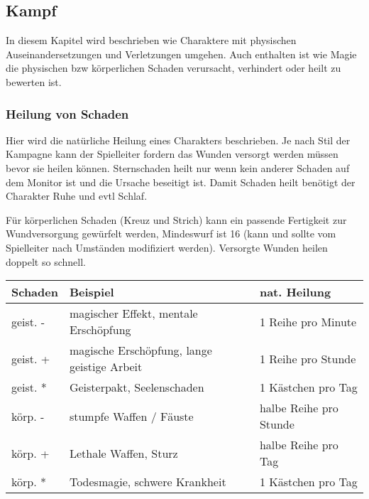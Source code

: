 \documentclass{article}
\begin{document}
\begin{center}
\section{Kampf}
\end{center}

In diesem Kapitel wird beschrieben wie Charaktere mit physischen Auseinandersetzungen und Verletzungen umgehen. Auch
enthalten ist wie Magie die physischen bzw körperlichen Schaden verursacht, verhindert oder heilt zu bewerten ist.

\subsubsection{Heilung von Schaden}

Hier wird die natürliche Heilung eines Charakters beschrieben. Je nach Stil der Kampagne kann der Spielleiter
fordern das Wunden versorgt werden müssen bevor sie heilen können. Sternschaden heilt nur wenn kein anderer Schaden
auf dem Monitor ist und die Ursache beseitigt ist. Damit Schaden heilt benötigt der Charakter Ruhe und evtl Schlaf.

Für körperlichen Schaden (Kreuz und Strich) kann ein passende Fertigkeit zur Wundversorgung gewürfelt werden,
Mindeswurf ist 16 (kann und sollte vom Spielleiter nach Umständen modifiziert werden). Versorgte Wunden heilen
doppelt so schnell.


\begin{small}
\begin{tabular}{|m{3cm}|m{5cm}|m{5cm}|}
\hline
\textbf{Schaden}&\textbf{Beispiel}&\textbf{nat. Heilung}\\
\hline
\hline
geist. -&magischer Effekt, mentale Erschöpfung&1 Reihe pro Minute\\
\hline
geist. +&magische Erschöpfung, lange geistige Arbeit&1 Reihe pro Stunde\\
\hline
geist. *&Geisterpakt, Seelenschaden&1 Kästchen pro Tag\\
\hline
körp. -&stumpfe Waffen / Fäuste&halbe Reihe pro Stunde\\
\hline
körp. +&Lethale Waffen, Sturz&halbe Reihe pro Tag\\
\hline
körp. *&Todesmagie, schwere Krankheit&1 Kästchen pro Tag\\
\hline
\end{tabular}
\end{small}
\end{document}
